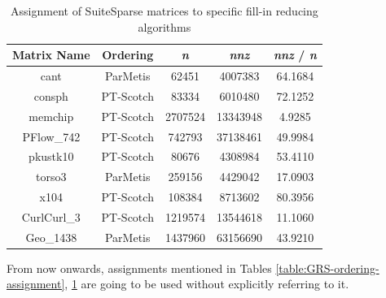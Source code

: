 \begin{table}[!h]
\centering
\begin{tabular}{|c|c|c|c|c|}
\hline
Matrix Name & Ordering  & \textit{n}       & \textit{nnz}      & \textit{nnz} / \textit{n} \\ \hline
cant        & ParMetis  & 62451   & 4007383  & 64.1684 \\ \hline
consph      & PT-Scotch & 83334   & 6010480  & 72.1252 \\ \hline
memchip     & PT-Scotch & 2707524 & 13343948 & 4.9285  \\ \hline
PFlow\_742  & PT-Scotch & 742793  & 37138461 & 49.9984 \\ \hline
pkustk10    & PT-Scotch & 80676   & 4308984  & 53.4110 \\ \hline
torso3      & ParMetis  & 259156  & 4429042  & 17.0903 \\ \hline
x104        & PT-Scotch & 108384  & 8713602  & 80.3956 \\ \hline
CurlCurl\_3 & PT-Scotch & 1219574 & 13544618 & 11.1060 \\ \hline
Geo\_1438   & ParMetis  & 1437960 & 63156690 & 43.9210 \\ \hline
\end{tabular}
\caption{Assignment of SuiteSparse matrices to specific fill-in reducing algorithms}
\label{table:SuiteSparse-ordering-assignment}
\end{table}


From now onwards, assignments mentioned in Tables \ref{table:GRS-ordering-assignment}, \ref{table:SuiteSparse-ordering-assignment} are going to be used without explicitly referring to it.\\
